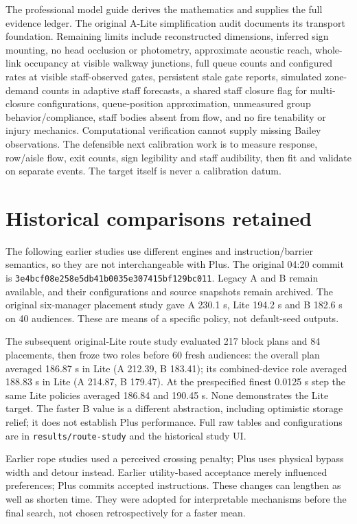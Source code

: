 \documentclass[11pt,a4paper]{article}
\newcommand{\code}[1]{{\small\nolinkurl{#1}}}
\begin{document}
The professional model guide derives the mathematics and supplies the full evidence ledger. The original A-Lite simplification audit documents its transport foundation. Remaining limits include reconstructed dimensions, inferred sign mounting, no head occlusion or photometry, approximate acoustic reach, whole-link occupancy at visible walkway junctions, full queue counts and configured rates at visible staff-observed gates, persistent stale gate reports, simulated zone-demand counts in adaptive staff forecasts, a shared staff closure flag for multi-closure configurations, queue-position approximation, unmeasured group behavior/compliance, staff bodies absent from flow, and no fire tenability or injury mechanics. Computational verification cannot supply missing Bailey observations. The defensible next calibration work is to measure response, row/aisle flow, exit counts, sign legibility and staff audibility, then fit and validate on separate events. The target itself is never a calibration datum.


\section{Historical comparisons retained}

The following earlier studies use different engines and instruction/barrier semantics, so they are not interchangeable with Plus. The original 04:20 commit is \code{3e4bcf08e258e5db41b0035e307415bf129bc011}. Legacy A and B remain available, and their configurations and source snapshots remain archived. The original six-manager placement study gave A 230.1 s, Lite 194.2 s and B 182.6 s on 40 audiences. These are means of a specific policy, not default-seed outputs.


The subsequent original-Lite route study evaluated 217 block plans and 84 placements, then froze two roles before 60 fresh audiences: the overall plan averaged 186.87 s in Lite (A 212.39, B 183.41); its combined-device role averaged 188.83 s in Lite (A 214.87, B 179.47). At the prespecified finest 0.0125 s step the same Lite policies averaged 186.84 and 190.45 s. None demonstrates the Lite target. The faster B value is a different abstraction, including optimistic storage relief; it does not establish Plus performance. Full raw tables and configurations are in \code{results/route-study} and the historical study UI.


Earlier rope studies used a perceived crossing penalty; Plus uses physical bypass width and detour instead. Earlier utility-based acceptance merely influenced preferences; Plus commits accepted instructions. These changes can lengthen as well as shorten time. They were adopted for interpretable mechanisms before the final search, not chosen retrospectively for a faster mean.
\end{document}
